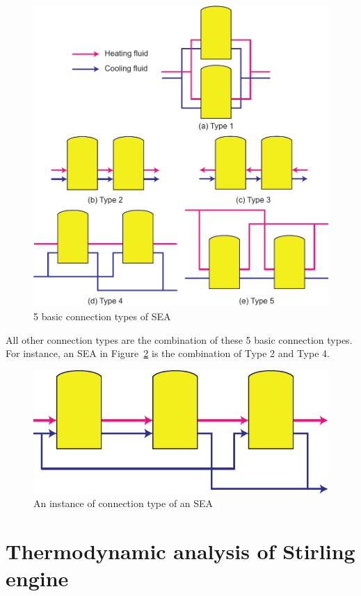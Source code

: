 \documentclass[preprint,5p, twocolumn]{elsarticle}
\begin{document}
\noindent \begin{figure}[htbp]
\begin{center}
	\includegraphics[width = 0.7\columnwidth]{./graphics/BasicSEA}
	\caption{5 basic connection types of SEA}
	\label{fig:SEA}
\end{center}
\end{figure}

All other connection types are the combination of these 5 basic connection types. For instance, an SEA in Figure~\ref{fig:SEA_eg} is the combination of Type 2 and Type 4. 

\noindent \begin{figure}[htbp]
\begin{center}
	\includegraphics[width = 0.7\columnwidth]{./graphics/SEA_eg}
	\caption{An instance of connection type of an SEA}
	\label{fig:SEA_eg}
\end{center}
\end{figure}

\section{Thermodynamic analysis of Stirling engine}
\end{document}
